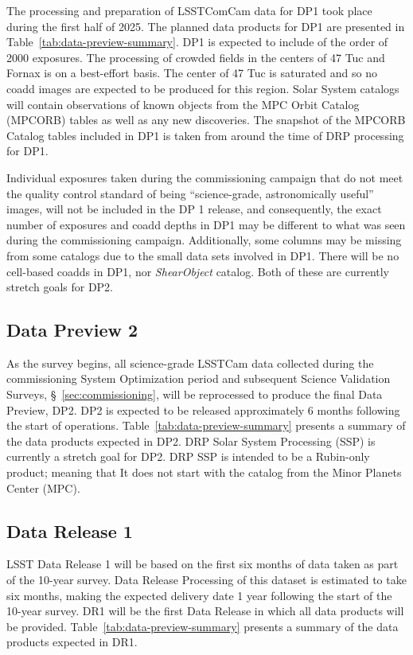 The  processing and preparation of LSSTComCam data for DP1 took place during the first half of 2025.
The planned data products for DP1 are presented in Table~\ref{tab:data-preview-summary}.
DP1 is expected to include of the order of 2000 exposures.
The processing of crowded fields in the centers of 47 Tuc and Fornax is on a best-effort basis.
The center of 47 Tuc is saturated and so no coadd images are expected to be produced for this region.
Solar System catalogs will contain observations of known objects from the MPC Orbit Catalog (MPCORB) tables as well as any new discoveries.
The snapshot of the MPCORB Catalog tables included in DP1 is taken from around the time of DRP processing for DP1.

Individual exposures taken during the commissioning campaign  that do not meet the quality control standard of being ``science-grade, astronomically useful'' images, will not be included in the DP	1 release,
and consequently, the exact number of exposures and coadd depths in DP1 may be different to what was seen during the commissioning campaign.
Additionally, some columns may be missing from some catalogs due to the small data sets involved in DP1.
There will be no cell-based coadds in DP1, nor \textit{ShearObject} catalog.
Both of these are currently stretch goals for DP2.

\subsection{Data Preview 2}
\label{ssec:dp2}

As the survey begins, all science-grade LSSTCam data collected during the commissioning System Optimization period and subsequent Science Validation Surveys, \S~\ref{sec:commissioning},
will be reprocessed to produce the final Data Preview, DP2.
DP2 is expected to be released approximately 6 months following the start of operations.
Table~\ref{tab:data-preview-summary} presents a summary of the data products expected in DP2.
DRP Solar System Processing (SSP)  is currently a stretch goal for DP2.
DRP SSP is intended to be a Rubin-only product; meaning that It does not start with the catalog from the Minor Planets Center (MPC).

\subsection{Data Release 1}
\label{ssec:dr1}

LSST Data Release 1 will be based on the first six months of data taken as part of the 10-year survey.
Data Release Processing of this dataset is estimated to take six months, making the expected delivery date 1 year following the start of the 10-year survey.
DR1 will be the first Data Release in which all data products will be provided.
Table~\ref{tab:data-preview-summary} presents a summary of the data products expected in DR1.
